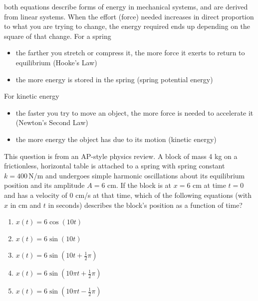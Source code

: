both equations describe forms of energy in mechanical systems, and are derived from
linear systems. When the effort (force) needed increases in direct
proportion to what you are trying to change, the energy required ends up
depending on the square of that change. For a spring
\begin{itemize}
	\item[-] the farther you stretch or compress it, the more force it exerts to
		return to equilibrium (Hooke's Law)

	\item[-] the more energy is stored in the spring (spring potential energy)
\end{itemize}
For kinetic energy
\begin{itemize}
	\item[-] the faster you try to move an object, the more force is needed to
		accelerate it (Newton's Second Law)

	\item[-] the more energy the object has due to its motion (kinetic energy)
\end{itemize}
\begin{Exercise}
	[label={ex:springequation}, title={Finding the equation for a mass-spring system}]
	This question is from an AP-style physics review. A block of mass 4 kg on a frictionless,
	horizontal table is attached to a spring with spring constant
	$k = 400 \, \text{N/m}$ and undergoes simple harmonic oscillations about its
	equilibrium position and its amplitude $A=6$ cm. If the block is at $x=6$ cm at
	time $t=0$ and has a velocity of $0$ cm/s at that time, which of the following
	equations (with $x$ in cm and $t$ in seconds) describes the block's position
	as a function of time?

	\begin{enumerate}[label=(\Alph{*})]
		\item $x(t) = 6 \cos(10t)$

		\item $x(t) = 6 \sin(10t)$

		\item $x(t) = 6 \sin(10t + \frac{1}{2}\pi)$

		\item $x(t) = 6 \sin(10\pi t + \frac{1}{2}\pi)$

		\item $x(t) = 6 \sin(10\pi t - \frac{1}{2}\pi)$
	\end{enumerate}
\end{Exercise}
